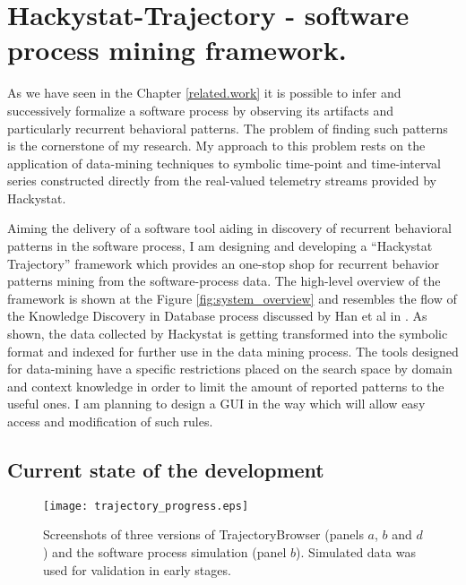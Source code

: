 \chapter{Hackystat-Trajectory - software process mining framework.} \label{trajectory}
As we have seen in the Chapter \ref{related.work} it is possible to infer and successively formalize a software process by observing its artifacts and particularly recurrent behavioral patterns. The problem of finding such patterns is the cornerstone of my research. My approach to this problem rests on the application of data-mining techniques to symbolic time-point and time-interval series constructed directly from the real-valued telemetry streams provided by Hackystat.

Aiming the delivery of a software tool aiding in discovery of recurrent behavioral patterns in the software process, I am designing and developing a ``Hackystat Trajectory'' framework which provides an one-stop shop for recurrent behavior patterns mining from the software-process data. The high-level overview of the framework is shown at the Figure \ref{fig:system_overview} and resembles the flow of the Knowledge Discovery in Database process discussed by Han et al in \cite{citeulike:709476}. As shown, the data collected by Hackystat is getting transformed into the symbolic format and indexed for further use in the data mining process. The tools designed for data-mining have a specific restrictions placed on the search space by domain and context knowledge in order to limit the amount of reported patterns to the useful ones. I am planning to design a GUI in the way which will allow easy access and modification of such rules. 

\section{Current state of the development}

\begin{figure}[tbp]
   \centering
   \texttt{[image: trajectory\_progress.eps]}
   \caption{Screenshots of three versions of TrajectoryBrowser (panels $a$, $b$ and $d$) and the software process simulation (panel $b$). Simulated data was used for validation in early stages.}
   \label{fig:trajectory_progress}
\end{figure}

